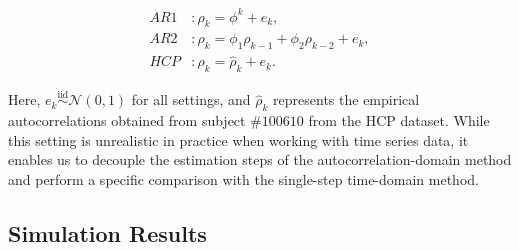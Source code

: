 \documentclass[docs/main.tex]{subfiles}
\begin{document}
\begin{align}
    \textit{AR1}&: \rho_k = \phi^k + e_k,\\
    \textit{AR2}&: \rho_k = \phi_1\rho_{k-1} + \phi_2\rho_{k-2} + e_k,\\
    \textit{HCP}&: \rho_k = \hat\rho_k + e_k.
\end{align}

\noindent Here, $e_k \overset{\text{iid}}{\sim} \mathcal{N}(0, 1)$ for all settings, and $\hat\rho_k$ represents the empirical autocorrelations obtained from subject $\#100610$ from the HCP dataset. While this setting is unrealistic in practice when working with time series data, it enables us to decouple the estimation steps of the autocorrelation-domain method and perform a specific comparison with the single-step time-domain method.

\subsection{Simulation Results}
\end{document}
